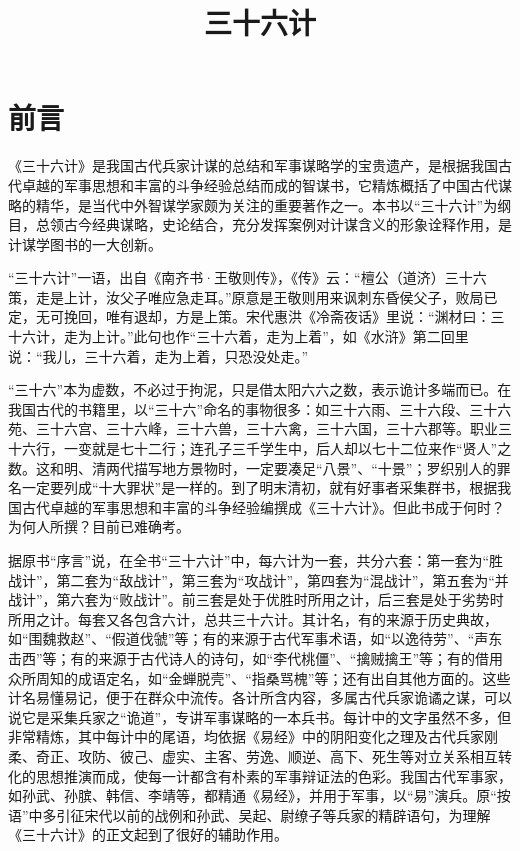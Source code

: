 \documentclass[12pt,UTF8]{ctexbook}
\title{\heiti\zihao{0} 三十六计}
\author{}
\date{}
\begin{document}
\maketitle
\tableofcontents

\frontmatter

\chapter{前言}

《三十六计》是我国古代兵家计谋的总结和军事谋略学的宝贵遗产，是根据我国古代卓越的军事思想和丰富的斗争经验总结而成的智谋书，它精炼概括了中国古代谋略的精华，是当代中外智谋学家颇为关注的重要著作之一。本书以“三十六计”为纲目，总领古今经典谋略，史论结合，充分发挥案例对计谋含义的形象诠释作用，是计谋学图书的一大创新。

“三十六计”一语，出自《南齐书·王敬则传》，《传》云：“檀公（道济）三十六策，走是上计，汝父子唯应急走耳。”原意是王敬则用来讽刺东昏侯父子，败局已定，无可挽回，唯有退却，方是上策。宋代惠洪《冷斋夜话》里说：“渊材曰：三十六计，走为上计。”此句也作“三十六着，走为上着”，如《水浒》第二回里说：“我儿，三十六着，走为上着，只恐没处走。”

“三十六”本为虚数，不必过于拘泥，只是借太阳六六之数，表示诡计多端而已。在我国古代的书籍里，以“三十六”命名的事物很多：如三十六雨、三十六段、三十六苑、三十六宫、三十六峰，三十六兽，三十六禽，三十六国，三十六郡等。职业三十六行，一变就是七十二行；连孔子三千学生中，后人却以七十二位来作“贤人”之数。这和明、清两代描写地方景物时，一定要凑足“八景”、“十景”；罗织别人的罪名一定要列成“十大罪状”是一样的。到了明末清初，就有好事者采集群书，根据我国古代卓越的军事思想和丰富的斗争经验编撰成《三十六计》。但此书成于何时？为何人所撰？目前已难确考。

据原书“序言”说，在全书“三十六计”中，每六计为一套，共分六套：第一套为“胜战计”，第二套为“敌战计”，第三套为“攻战计”，第四套为“混战计”，第五套为“并战计”，第六套为“败战计”。前三套是处于优胜时所用之计，后三套是处于劣势时所用之计。每套又各包含六计，总共三十六计。其计名，有的来源于历史典故，如“围魏救赵”、“假道伐虢”等；有的来源于古代军事术语，如“以逸待劳”、“声东击西”等；有的来源于古代诗人的诗句，如“李代桃僵”、“擒贼擒王”等；有的借用众所周知的成语定名，如“金蝉脱壳”、“指桑骂槐”等；还有出自其他方面的。这些计名易懂易记，便于在群众中流传。各计所含内容，多属古代兵家诡谲之谋，可以说它是采集兵家之“诡道”，专讲军事谋略的一本兵书。每计中的文字虽然不多，但非常精炼，其中每计中的尾语，均依据《易经》中的阴阳变化之理及古代兵家刚柔、奇正、攻防、彼己、虚实、主客、劳逸、顺逆、高下、死生等对立关系相互转化的思想推演而成，使每一计都含有朴素的军事辩证法的色彩。我国古代军事家，如孙武、孙膑、韩信、李靖等，都精通《易经》，并用于军事，以“易”演兵。原“按语”中多引征宋代以前的战例和孙武、吴起、尉缭子等兵家的精辟语句，为理解《三十六计》的正文起到了很好的辅助作用。
\end{document}
